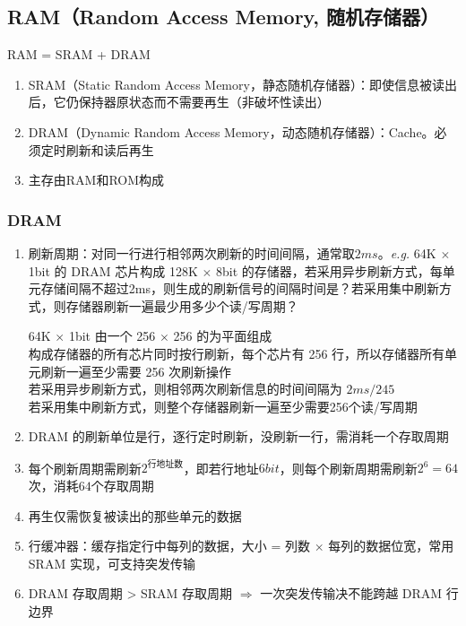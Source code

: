 \documentclass[a4paper,12pt]{article}
\begin{document}
    \subsection{RAM（Random Access Memory, 随机存储器）}

    RAM = SRAM + DRAM
    \begin{enumerate}
        \item SRAM（Static Random Access Memory，静态随机存储器）：即使信息被读出后，它仍保持器原状态而不需要再生（非破坏性读出）
        \item DRAM（Dynamic Random Access Memory，动态随机存储器）：Cache。必须定时刷新和读后再生
        \item 主存由RAM和ROM构成
    \end{enumerate}

    \subsubsection{DRAM}

    \begin{enumerate}
        \item 刷新周期：对同一行进行相邻两次刷新的时间间隔，通常取$2ms$。\emph{e.g.} 64K $\times$ 1bit 的 DRAM 芯片构成 128K $\times$ 8bit 的存储器，若采用异步刷新方式，每单元存储间隔不超过2ms，则生成的刷新信号的间隔时间是？若采用集中刷新方式，则存储器刷新一遍最少用多少个读/写周期？
        \begin{analysisbox}
            64K $\times$ 1bit 由一个 256 $\times$ 256 的为平面组成 \\
            构成存储器的所有芯片同时按行刷新，每个芯片有 256 行，所以存储器所有单元刷新一遍至少需要 256 次刷新操作 \\
            若采用异步刷新方式，则相邻两次刷新信息的时间间隔为 $2ms/245$ \\
            若采用集中刷新方式，则整个存储器刷新一遍至少需要256个读/写周期
        \end{analysisbox}
        \item DRAM 的刷新单位是行，逐行定时刷新，没刷新一行，需消耗一个存取周期
        \item 每个刷新周期需刷新$2^{\text{行地址数}}$，即若行地址$6bit$，则每个刷新周期需刷新$2^6 = 64$次，消耗$64$个存取周期
        \item 再生仅需恢复被读出的那些单元的数据
        \item 行缓冲器：缓存指定行中每列的数据，大小 = 列数 $\times$ 每列的数据位宽，常用 SRAM 实现，可支持突发传输
        \item DRAM 存取周期 > SRAM 存取周期 $\Rightarrow$ 一次突发传输决不能跨越 DRAM 行边界
    \end{enumerate}
\end{document}
